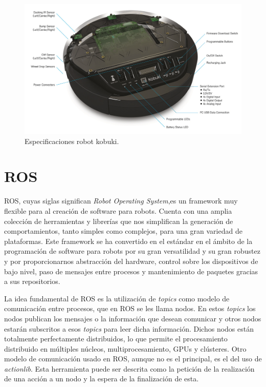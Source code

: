 \begin{figure} [H]
  \begin{center}
    \includegraphics[width=12cm]{img/cap3/kobukispec}
  \end{center}
  \caption{Especificaciones robot kobuki.}
  \label{fig:espckobuki}
\end{figure}

\section{ROS}
\label{cap:ros}
ROS, cuyas siglas significan \textit{Robot Operating System},es un framework muy flexible para al creación de software para robots. Cuenta con una amplia colección de herramientas y librerías que nos simplifican la generación de comportamientos, tanto simples como complejos, para una gran variedad de plataformas. Este framework se ha convertido en el estándar en el ámbito de la programación de software para robots por su gran versatilidad y su gran robustez y por proporcionarnos abstracción del hardware, control sobre los dispositivos de bajo nivel, paso de mensajes entre procesos y mantenimiento de paquetes gracias a sus repositorios.

La idea fundamental de ROS es la utilización de \textit{topics} como modelo de comunicación entre procesos, que en ROS se les llama nodos. En estos \textit{topics} los nodos publican los mensajes o la información que desean comunicar y otros nodos estarán subscritos a esos \textit{topics} para leer dicha información. Dichos nodos están totalmente perfectamente distribuidos, lo que permite el procesamiento distribuido en múltiples núcleos, multiprocesamiento, GPUs y clústeres. Otro modelo de comunicación usado en ROS, aunque no es el principal, es el del uso de \textit{actionlib}\footnotemark. Esta herramienta puede ser descrita como la petición de la realización de una acción a un nodo y la espera de la finalización de esta.

